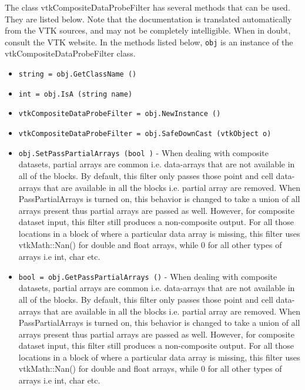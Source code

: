 The class vtkCompositeDataProbeFilter has several methods that can be used.
  They are listed below.
Note that the documentation is translated automatically from the VTK sources,
and may not be completely intelligible.  When in doubt, consult the VTK website.
In the methods listed below, \verb|obj| is an instance of the vtkCompositeDataProbeFilter class.
\begin{itemize}
\item  \verb|string = obj.GetClassName ()|

\item  \verb|int = obj.IsA (string name)|

\item  \verb|vtkCompositeDataProbeFilter = obj.NewInstance ()|

\item  \verb|vtkCompositeDataProbeFilter = obj.SafeDownCast (vtkObject o)|

\item  \verb|obj.SetPassPartialArrays (bool )| -  When dealing with composite datasets, partial arrays are common i.e.
 data-arrays that are not available in all of the blocks. By default, this
 filter only passes those point and cell data-arrays that are available in
 all the blocks i.e. partial array are removed.  When PassPartialArrays is
 turned on, this behavior is changed to take a union of all arrays present
 thus partial arrays are passed as well. However, for composite dataset
 input, this filter still produces a non-composite output. For all those
 locations in a block of where a particular data array is missing, this
 filter uses vtkMath::Nan() for double and float arrays, while 0 for all
 other types of arrays i.e int, char etc.

\item  \verb|bool = obj.GetPassPartialArrays ()| -  When dealing with composite datasets, partial arrays are common i.e.
 data-arrays that are not available in all of the blocks. By default, this
 filter only passes those point and cell data-arrays that are available in
 all the blocks i.e. partial array are removed.  When PassPartialArrays is
 turned on, this behavior is changed to take a union of all arrays present
 thus partial arrays are passed as well. However, for composite dataset
 input, this filter still produces a non-composite output. For all those
 locations in a block of where a particular data array is missing, this
 filter uses vtkMath::Nan() for double and float arrays, while 0 for all
 other types of arrays i.e int, char etc.


\end{itemize}
